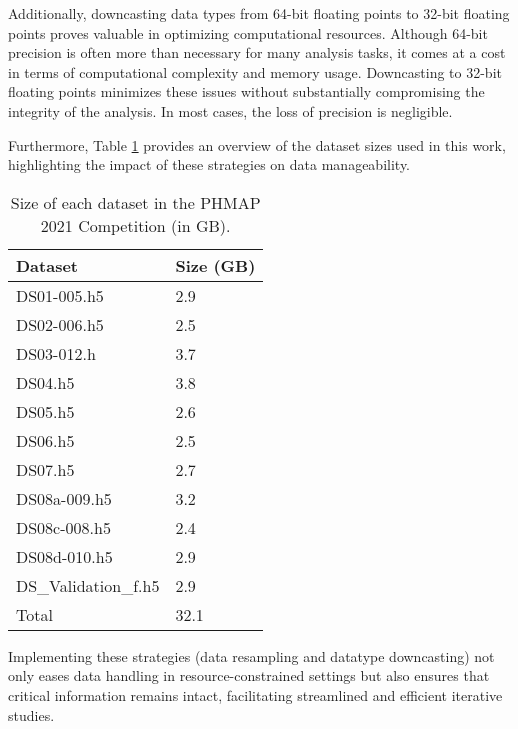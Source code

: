 \documentclass{IEEEtran}
\begin{document}
            Additionally, downcasting data types from 64-bit floating points to 32-bit floating points proves valuable in optimizing computational resources. Although 64-bit precision is often more than necessary for many analysis tasks, it comes at a cost in terms of computational complexity and memory usage. Downcasting to 32-bit floating points minimizes these issues without substantially compromising the integrity of the analysis. In most cases, the loss of precision is negligible.

            Furthermore, Table \ref{tab:raw_sizes} provides an overview of the dataset sizes used in this work, highlighting the impact of these strategies on data manageability.
            \begin{table}[!htbp]
                \caption{Size of each dataset in the PHMAP 2021 Competition (in GB).}
                \label{tab:raw_sizes}
                \centering
                \begin{tabular}{ll}
                    \toprule
                    Dataset & Size (GB) \\
                    \midrule
                    DS01-005.h5 & 2.9 \\
                    DS02-006.h5 & 2.5 \\
                    DS03-012.h & 3.7 \\
                    DS04.h5 & 3.8 \\
                    DS05.h5 & 2.6 \\
                    DS06.h5 & 2.5 \\
                    DS07.h5 & 2.7 \\
                    DS08a-009.h5 & 3.2 \\
                    DS08c-008.h5 & 2.4 \\
                    DS08d-010.h5 & 2.9 \\
                    DS\_Validation\_f.h5 & 2.9 \\
                    \midrule
                    Total & 32.1 \\
                    \bottomrule
                \end{tabular}
            \end{table}

            Implementing these strategies (data resampling and datatype downcasting) not only eases data handling in resource-constrained settings but also ensures that critical information remains intact, facilitating streamlined and efficient iterative studies.
\end{document}
